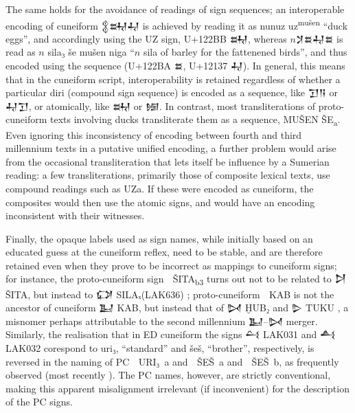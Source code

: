 The same holds for the avoidance of readings of sign sequences; an
interoperable encoding of cunei\-form {\oraccnoto 𒉭𒊻𒄷} is achieved by
reading it as nunuz uz\textsuperscript{mušen} “duck eggs”, and
accordingly using the UZ sign, U+122BB {\oraccnoto 𒊻}, whereas
$n${\oraccnoto 𒋡𒊺𒄷𒊺} is read as $n$ sila₃ še mušen niga
“$n$ sila of barley for the fattenened birds”, and thus
encoded using the sequence (U+122BA {\oraccnoto 𒊺}, U+12137
{\oraccnoto 𒄷}). In general, this means that in the cuneiform script,
interoperability is retained regardless of whether a particular diri
(compound sign sequence) is encoded as a sequence, like {\oraccnoto
𒋛𒀀} or {\oraccnoto 𒄷𒋛}, or atomically, like {\oraccnoto 𒊻} or
{\oraccnoto 𒎏}. In contrast, most transliterations of proto-cuneiform
texts involving ducks transliterate them as a sequence, MUŠEN
ŠE\textsubscript{a}. Even ignoring this inconsistency of encoding
between fourth and third millennium texts in a putative unified
encoding, a further problem would arise from the occasional
transliteration that lets itself be influence by a Sumerian reading: a
few transliterations, primarily those of composite lexical texts, use
compound readings such as UZa. If these were encoded as cuneiform, the
composites would then use the atomic signs, and would have an encoding
inconsistent with their witnesses.

Finally, the opaque labels used as sign names, while initially based
on an educated guess at the cuneiform reflex, need to be stable, and
are therefore retained even when they prove to be incorrect as
mappings to cuneiform signs; for instance, the proto-cuneiform sign
{\oraccpc 𒩁} ŠITA\textsubscript{b3} turns out not to be related to
{\oraccnoto 𒋖} ŠITA, but instead to {\oraccnoto 𒔌}
SILAₓ(LAK636) \cite[220]{Wagensonner2016}; proto-cuneiform {\oraccpc
𒡱} KAB is not the ancestor of cuneiform {\oraccnoto 𒆏} KAB, but
instead that of {\oraccnoto 𒄸} ḪUB₂ and {\oraccnoto 𒌇}
TUKU \cite[274]{Wagensonner2016}, a misnomer perhaps attributable to
the second millennium {\oraccnoto 𒆏}–{\oraccnoto 𒄸} merger. Similarly,
the realisation that in ED cuneiform the signs {\oraccnoto 𒌶} LAK031
and {\oraccnoto 𒋀} LAK032 corespond to uri₃, ``standard'' and šeš,
``brother'', respectively, is reversed in the naming of PC {\oraccpc
𒫔} URI₃~a and {\oraccpc 𒨲} ŠEŠ~a and {\oraccpc 𒨳} ŠEŠ~b, as frequently
observed (most recently \cite[154-158]{Selz2025}). The PC names,
however, are strictly conventional, making this apparent misalignment
irrelevant (if inconvenient) for the description of the PC signs.

